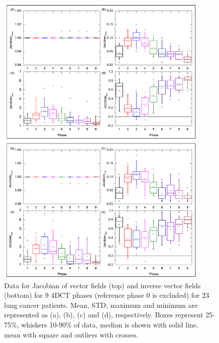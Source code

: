 \documentclass[type=dr, dr=rernat, accentcolor=tud7b,colorbacktitle, bigchapter, openright, twoside, 12pt ]{tudthesis}
\begin{document}
\begin{figure}[H]
	\begin{center}		
		\includegraphics[width=0.9\textwidth]{./Images/Jacobian_data_pigs.png}
		\caption{Data for Jacobian of vector fields (top) and inverse vector fields (bottom) for 9 4DCT phases (reference phase 0 is excluded) for 23 lung cancer patients. Mean, STD, maximum and minimum are represented as (a), (b), (c) and (d), respectively.
		Boxes represent 25-75\%, whiskers 10-90\% of data, median is shown with solid line, mean with square and outliers with crosses.}
		\label{jacobian_data_pigs}
	\end{center}
\end{figure}
\end{document}
